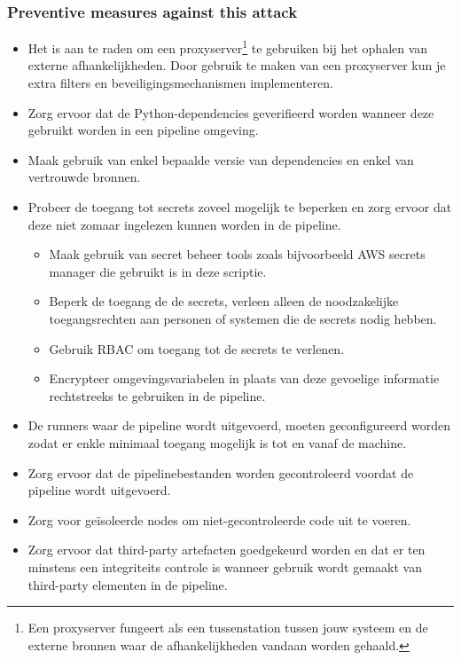 \subsubsection{
{Preventive measures against this attack}}
\label{sec:Hoe deze aanval te voorkomen}

\begin{itemize}
  \item Het is aan te raden om een proxyserver\footnote{ Een proxyserver fungeert als een tussenstation tussen jouw systeem en de externe bronnen waar de afhankelijkheden vandaan worden gehaald.} te gebruiken bij het ophalen van externe afhankelijkheden. Door gebruik te maken van een proxyserver kun je extra filters en beveiligingsmechanismen implementeren. 
  \item Zorg ervoor dat de Python-dependencies geverifieerd worden wanneer deze gebruikt worden in een pipeline omgeving.
  \item Maak gebruik van enkel bepaalde versie van dependencies en enkel van vertrouwde bronnen.
  \item Probeer de toegang tot secrets zoveel mogelijk te beperken en zorg ervoor dat deze niet zomaar ingelezen kunnen worden in de pipeline.
  \begin{itemize}
    \item Maak gebruik van secret beheer tools zoals bijvoorbeeld AWS secrets manager die gebruikt is in deze scriptie.
    \item Beperk de toegang de de secrets, verleen alleen de noodzakelijke toegangsrechten aan personen of systemen die de secrets nodig hebben.
    \item Gebruik RBAC om toegang tot de secrets te verlenen.
    \item Encrypteer omgevingsvariabelen in plaats van deze gevoelige informatie rechtstreeks te gebruiken in de pipeline.
  \end{itemize}
  \item De runners waar de pipeline wordt uitgevoerd, moeten geconfigureerd worden zodat er enkle minimaal toegang mogelijk is tot en vanaf de machine.
  \item Zorg ervoor dat de pipelinebestanden worden gecontroleerd voordat de pipeline wordt uitgevoerd.
  \item Zorg voor geïsoleerde nodes om niet-gecontroleerde code uit te voeren.
  \item Zorg ervoor dat third-party artefacten goedgekeurd worden en dat er ten minstens een integriteits controle is wanneer gebruik wordt gemaakt van third-party elementen in de pipeline.
\end{itemize}


